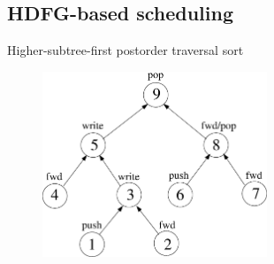 \documentclass{beamer}
\begin{document}
\begin{CJK}{UTF8}{bkai}
    \subsection{HDFG-based scheduling}
    \begin{frame}{Higher-subtree-first postorder traversal sort}
        \begin{figure}[!h]
            \begin{center}
                \includegraphics[width=0.6\textwidth]{figs/hfpt.eps}
            \end{center}
            \label{fig:hfpt}
        \end{figure}%
    \end{frame}


\end{CJK}
\end{document}
